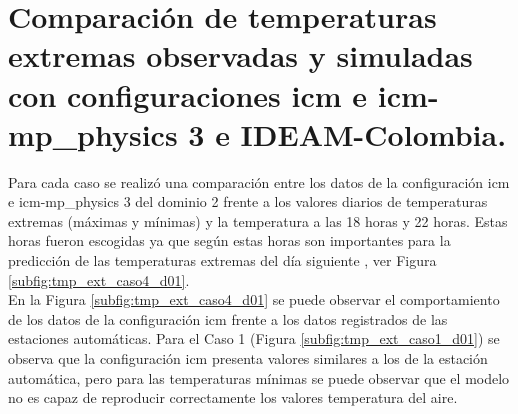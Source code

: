 



\section{Comparación de temperaturas extremas observadas y simuladas con configuraciones icm e icm-mp\_physics 3 e IDEAM-Colombia.}

Para cada caso se realizó una comparación entre los datos de la configuración icm e icm-mp\_physics 3 del dominio 2 frente a los valores diarios de temperaturas extremas (máximas y mínimas) y la temperatura a las 18 horas y 22 horas. Estas horas fueron escogidas ya que según \citet{snyder2005frost} estas horas son importantes para la predicción de las temperaturas extremas del día siguiente \citet{prabha2008}, ver Figura \ref{subfig:tmp_ext_caso4_d01}.\\

En la Figura \ref{subfig:tmp_ext_caso4_d01} se puede observar el comportamiento de los datos de la configuración icm frente a los datos registrados de las estaciones automáticas. Para el Caso 1 (Figura \ref{subfig:tmp_ext_caso1_d01}) se observa que la configuración icm presenta valores similares a los de la estación automática, pero para las temperaturas mínimas se puede observar que el modelo no es capaz de reproducir correctamente los valores temperatura del aire.\\

